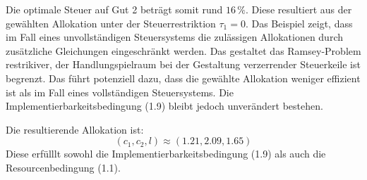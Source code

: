 Die optimale Steuer auf Gut 2 beträgt somit rund \( 16\,\% \). Diese resultiert aus der gewählten Allokation unter der Steuerrestriktion \( \tau_1 = 0 \). Das Beispiel zeigt, dass im Fall eines unvollständigen Steuersystems die zulässigen Allokationen durch zusätzliche Gleichungen eingeschränkt werden. Das gestaltet das Ramsey-Problem restrikiver, der Handlungspielraum bei der Gestaltung verzerrender Steuerkeile ist begrenzt. Das führt potenziell dazu, dass die gewählte Allokation weniger effizient ist als im Fall eines vollständigen Steuersystems. Die Implementierbarkeitsbedingung (1.9) bleibt jedoch unverändert bestehen.

Die resultierende Allokation ist:
\[
(c_1, c_2, l) \approx (1.21, 2.09, 1.65)
\]
Diese erfülllt sowohl die Implementierbarkeitsbedingung (1.9) als auch die Resourcenbedingung (1.1). 